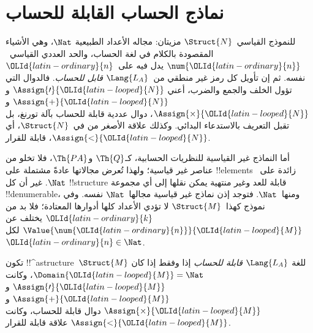 \documentclass[../../../include/open-logic-section]{subfiles}
\begin{document}
\section{نماذج الحساب القابلة للحساب}

\begin{explain}
للنموذج القياسي~$\Struct{N}$ مزيتان: مجاله الأعداد الطبيعية
$\Nat$، وهي الأشياء المقصودة بالكلام في لغة الحساب، والحد
العددي القياسي~$\num{\OLId{latin-ordinary}{n}}$ يدل فيه على~$\OLId{latin-ordinary}{n}$ نفسه. ثم إن تأويل
كل رمز غير منطقي من~$\Lang{L_A}$ \emph{قابل للحساب}.
فالدوال التي تؤول الخلف والجمع والضرب، أعني
$\Assign{\prime}{\OLId{latin-looped}{N}}$ و$\Assign{+}{\OLId{latin-looped}{N}}$ و$\Assign{\times}{\OLId{latin-looped}{N}}$،
دوال عددية قابلة للحساب بآلة تورنغ، بل تقبل التعريف
بالاستدعاء البدائي. وكذلك علاقة الأصغر من في~$\Struct{N}$،
أي $\Assign{<}{\OLId{latin-looped}{N}}$، قابلة للقرار.

أما النماذج غير القياسية للنظريات الحسابية، كـ$\Th{Q}$
و$\Th{PA}$، فلا تخلو من عناصر غير قياسية؛ ولهذا تُعرض
مجالاتها عادةً مشتملة على !!{element}s زائدة على~$\Nat$.
غير أن كل !!{structure} قابلة للعد وغير منتهية يمكن نقلها
إلى أي مجموعة !!{denumerable}، ومنها~$\Nat$.
فتوجد إذن نماذج غير قياسية مجالها~$\Nat$ نفسه.
وفي نموذج كهذا~$\Struct{M}$ لا تؤدي الأعداد كلها أدوارها
المعتادة؛ فلا بد من $\OLId{latin-ordinary}{k}$ يختلف عن $\Value{\num{\OLId{latin-ordinary}{n}}}{\OLId{latin-looped}{M}}$
لكل~$\OLId{latin-ordinary}{n} \in \Nat$.
\end{explain}

\begin{defn}
تكون !!^a{structure}~$\Struct{M}$ للغة $\Lang{L_A}$ \emph{قابلة
للحساب} إذا وفقط إذا كان $\Domain{\OLId{latin-looped}{M}}=\Nat$، وكانت
$\Assign{\prime}{\OLId{latin-looped}{M}}$ و$\Assign{+}{\OLId{latin-looped}{M}}$ و$\Assign{\times}{\OLId{latin-looped}{M}}$ دوال قابلة
للحساب، وكانت $\Assign{<}{\OLId{latin-looped}{M}}$ علاقة قابلة للقرار.
\end{defn}
\end{document}

